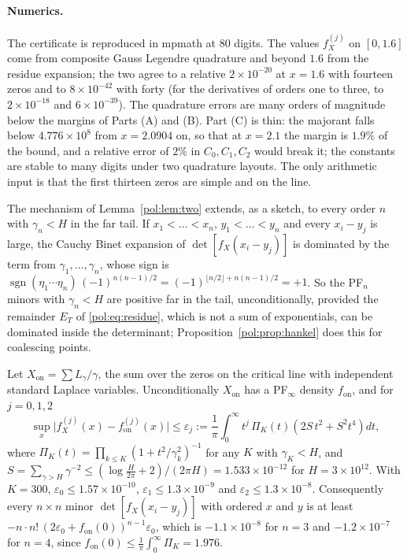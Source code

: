 \paragraph{Numerics.} The certificate is reproduced in mpmath at 80 digits. The values $f_X^{(j)}$ on $[0,1.6]$ come from composite Gauss Legendre quadrature and beyond $1.6$ from the residue expansion; the two agree to a relative $2\times10^{-20}$ at $x=1.6$ with fourteen zeros and to $8\times10^{-42}$ with forty (for the derivatives of orders one to three, to $2\times10^{-18}$ and $6\times10^{-39}$). The quadrature errors are many orders of magnitude below the margins of Parts (A) and (B). Part (C) is thin: the majorant falls below $4.776\times10^8$ from $x=2.0904$ on, so that at $x=2.1$ the margin is $1.9\%$ of the bound, and a relative error of $2\%$ in $C_0,C_1,C_2$ would break it; the constants are stable to many digits under two quadrature layouts. The only arithmetic input is that the first thirteen zeros are simple and on the line.

The mechanism of Lemma~\ref{pol:lem:two} extends, as a sketch, to every order $n$ with $\gamma_n<H$ in the far tail. If $x_1<\dots<x_n$, $y_1<\dots<y_n$ and every $x_i-y_j$ is large, the Cauchy Binet expansion of $\det[f_X(x_i-y_j)]$ is dominated by the term from $\gamma_1,\dots,\gamma_n$, whose sign is $\operatorname{sgn}(\eta_1\cdots\eta_n)\,(-1)^{n(n-1)/2}=(-1)^{\lfloor n/2\rfloor+n(n-1)/2}=+1$. So the PF$_n$ minors with $\gamma_n<H$ are positive far in the tail, unconditionally, provided the remainder $E_T$ of \eqref{pol:eq:residue}, which is not a sum of exponentials, can be dominated inside the determinant; Proposition~\ref{pol:prop:hankel} does this for coalescing points.

\begin{theorem}\label{pol:thm:approxpf}
Let $X_{\mathrm{on}}=\sum L_\gamma/\gamma$, the sum over the zeros on the critical line with independent standard Laplace variables. Unconditionally $X_{\mathrm{on}}$ has a PF$_\infty$ density $f_{\mathrm{on}}$, and for $j=0,1,2$
\begin{equation}\label{pol:eq:approxpf}
\sup_x\big|f_X^{(j)}(x)-f_{\mathrm{on}}^{(j)}(x)\big|\le\varepsilon_j:=\frac{1}{\pi}\int_0^\infty t^j\,\Pi_K(t)\left(2S\,t^2+S^2t^4\right)dt,
\end{equation}
where $\Pi_K(t)=\prod_{k\le K}(1+t^2/\gamma_k^2)^{-1}$ for any $K$ with $\gamma_K<H$, and $S=\sum_{\gamma>H}\gamma^{-2}\le(\log\frac{H}{2\pi}+2)/(2\pi H)=1.533\times10^{-12}$ for $H=3\times10^{12}$. With $K=300$, $\varepsilon_0\le1.57\times10^{-10}$, $\varepsilon_1\le1.3\times10^{-9}$ and $\varepsilon_2\le1.3\times10^{-8}$. Consequently every $n\times n$ minor $\det[f_X(x_i-y_j)]$ with ordered $x$ and $y$ is at least $-n\cdot n!\,(2\varepsilon_0+f_{\mathrm{on}}(0))^{n-1}\varepsilon_0$, which is $-1.1\times10^{-8}$ for $n=3$ and $-1.2\times10^{-7}$ for $n=4$, since $f_{\mathrm{on}}(0)\le\frac1\pi\int_0^\infty\Pi_K=1.976$.
\end{theorem}

